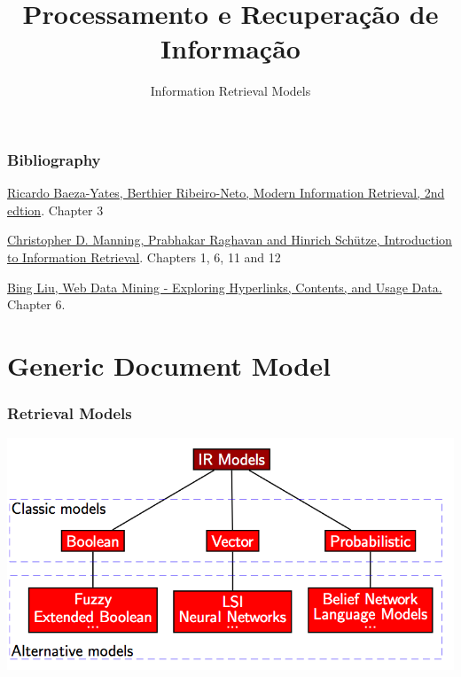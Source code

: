 \documentclass[svgnames]{beamer}
\title{Processamento e Recuperação de Informação}
\subtitle{Information Retrieval Models}
\begin{document}
\maketitle
\makeoutline

\begin{frame} \frametitle{Bibliography}

    \begin{block}{}
      \href{http://www.mir2ed.org/}{Ricardo Baeza-Yates,
            Berthier Ribeiro-Neto, Modern Information Retrieval, 2nd
            edtion}. Chapter 3
    \end{block}

    \begin{block}{}
      \href{http://nlp.stanford.edu/IR-book/}{Christopher D. Manning, Prabhakar Raghavan and Hinrich Schütze, Introduction to Information Retrieval}. Chapters 1, 6, 11 and 12
    \end{block}
    
        \begin{block}{}
      \href{https://www.cs.uic.edu/~liub/WebMiningBook.html}{Bing Liu, Web Data Mining - Exploring Hyperlinks, Contents, and Usage Data.} Chapter 6.
    \end{block}
    

\end{frame}

\section{Generic Document Model}

\begin{frame}
  \frametitle{Retrieval Models}

  \begin{center}
    \includegraphics[width=.8\linewidth]{retrieval-models.png}\\
  \end{center}

\end{frame}
\end{document}
